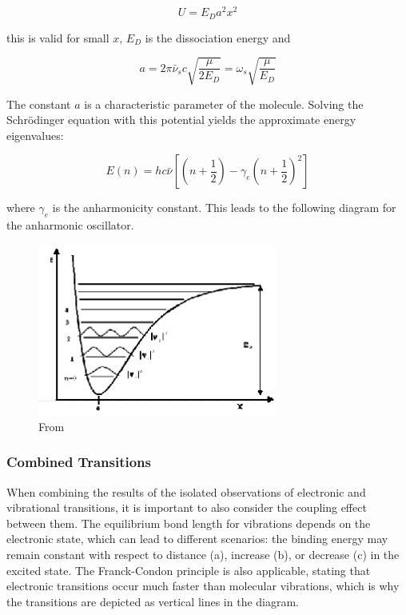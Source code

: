 \documentclass{article}
\begin{document}
\begin{equation*}
U = E_D a^2 x^2
\end{equation*}

this is valid for small $x$, $E_D$ is the dissociation energy and 

\begin{equation*}
a = 2\pi \bar{\nu}_s c \sqrt{\frac{\mu}{2E_D}} = \omega_s \sqrt{\frac{\mu}{E_D}}
\end{equation*}

The constant $a$ is a characteristic parameter of the molecule. Solving the Schrödinger equation with this potential yields the approximate energy eigenvalues:

\begin{equation*}
E(n) = h c \bar{\nu} \left[ \left(n + \frac{1}{2}\right) - \gamma_e \left(n + \frac{1}{2}\right)^2\right]
\end{equation*}

where $\gamma_e$ is the anharmonicity constant. This leads to the following diagram for the anharmonic oscillator.

\begin{figure}[h!]
	\centering
	\includegraphics[width=0.7\textwidth]{Figures/Introduction/Anharmonic.jpg}
	\caption{From \cite{riede_optical}}
\end{figure}

\pagebreak{}

\subsubsection{Combined Transitions}

When combining the results of the isolated observations of electronic and vibrational transitions, it is important to also consider the coupling effect between them. The equilibrium bond length for vibrations depends on the electronic state, which can lead to different scenarios: the binding energy may remain constant with respect to distance (a), increase (b), or decrease (c) in the excited state. The Franck-Condon principle is also applicable, stating that electronic transitions occur much faster than molecular vibrations, which is why the transitions are depicted as vertical lines in the diagram.
\end{document}
